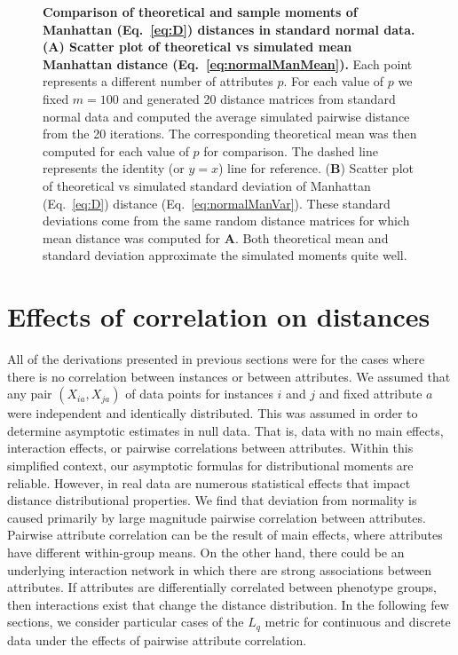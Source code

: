 \documentclass[10pt,letterpaper]{article}
\begin{document}
\begin{figure}[H]
	\centering
	\caption{{\bf Comparison of theoretical and sample moments of Manhattan (Eq.~\ref{eq:D}) distances in standard normal data. (\textbf{A}) Scatter plot of theoretical vs simulated mean Manhattan distance (Eq.~\ref{eq:normalManMean}).} Each point represents a different number of attributes $p$. For each value of $p$ we fixed $m=100$ and generated 20 distance matrices from standard normal data and computed the average simulated pairwise distance from the 20 iterations. The corresponding theoretical mean was then computed for each value of $p$ for comparison. The dashed line represents the identity (or $y=x$) line for reference. (\textbf{B}) Scatter plot of theoretical vs simulated standard deviation of Manhattan (Eq.~\ref{eq:D}) distance (Eq.~\ref{eq:normalManVar}). These standard deviations come from the same random distance matrices for which mean distance was computed for \textbf{A}. Both theoretical mean and standard deviation approximate the simulated moments quite well.}\label{fig:compare_theoretical_sample_moments}
\end{figure}

\section*{Effects of correlation on distances}\label{sec:correlation}

All of the derivations presented in previous sections were for the cases where there is no correlation between instances or between attributes. We assumed that any pair $(X_{ia},X_{ja})$ of data points for instances $i$ and $j$ and fixed attribute $a$ were independent and identically distributed. This was assumed in order to determine asymptotic estimates in null data. That is, data with no main effects, interaction effects, or pairwise correlations between attributes. Within this simplified context, our asymptotic formulas for distributional moments are reliable. However, in real data are numerous statistical effects that impact distance distributional properties. We find that deviation from normality is caused primarily by large magnitude pairwise correlation between attributes. Pairwise attribute correlation can be the result of main effects, where attributes have different within-group means. On the other hand, there could be an underlying interaction network in which there are strong associations between attributes. If attributes are differentially correlated between phenotype groups, then interactions exist that change the distance distribution. In the following few sections, we consider particular cases of the $L_q$ metric for continuous and discrete data under the effects of pairwise attribute correlation.
\end{document}
